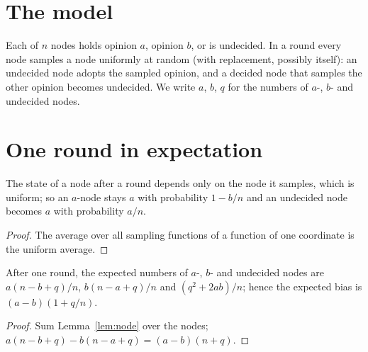 \begin{abstract}
We formalize the basic properties of the synchronous undecided-state dynamics with two opinions
on the complete graph: the exact one-round expectations of the three counts, the resulting
growth of the bias by the factor $1+q/n$ (the undecided nodes amplify the current majority), and
almost-sure absorption in a monochromatic configuration.
\end{abstract}

\section{The model}
\begin{definition}\label{def:usd}
\leanok
Each of $n$ nodes holds opinion $a$, opinion $b$, or is undecided. In a round every node samples a
node uniformly at random (with replacement, possibly itself): an undecided node adopts the sampled
opinion, and a decided node that samples the other opinion becomes undecided. We write $a$, $b$,
$q$ for the numbers of $a$-, $b$- and undecided nodes.
\end{definition}

\section{One round in expectation}
\begin{lemma}\label{lem:node}
\leanok{}
The state of a node after a round depends only on the node it samples, which is uniform; so an
$a$-node stays $a$ with probability $1-b/n$ and an undecided node becomes $a$ with probability $a/n$.
\end{lemma}
\begin{proof}\leanok
The average over all sampling functions of a function of one coordinate is the uniform average.
\end{proof}
\begin{theorem}\label{thm:expect}
\leanok{}
After one round, the expected numbers of $a$-, $b$- and undecided nodes are $a(n-b+q)/n$,
$b(n-a+q)/n$ and $(q^2+2ab)/n$; hence the expected bias is $(a-b)(1+q/n)$.
\end{theorem}
\begin{proof}\leanok
Sum Lemma~\ref{lem:node} over the nodes; $a(n-b+q)-b(n-a+q)=(a-b)(n+q)$.
\end{proof}

